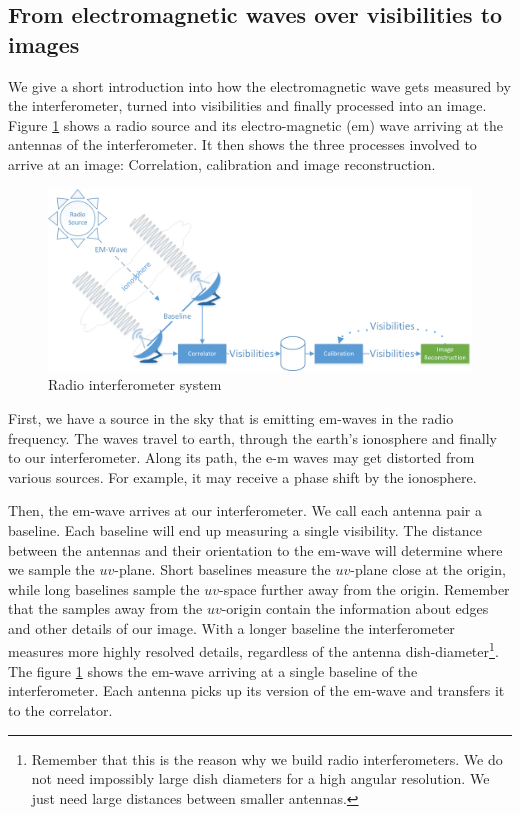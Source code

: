 \subsection{From electromagnetic waves over visibilities to images}
We give a short introduction into how the electromagnetic wave gets measured by the interferometer, turned into visibilities and finally processed into an image. Figure \ref{intro:system} shows a radio source and its electro-magnetic (em) wave arriving at the antennas of the interferometer. It then shows the three processes involved to arrive at an image: Correlation, calibration and image reconstruction.
	
\begin{figure}[h]
	\centering
	\includegraphics[width=0.80\linewidth]{./chapters/01.intro/system.png}
	\caption{Radio interferometer system}
	\label{intro:system}
\end{figure}

First, we have a source in the sky that is emitting em-waves in the radio frequency. The waves travel to earth, through the earth's ionosphere and finally to our interferometer. Along its path, the e-m waves may get distorted from various sources. For example, it may receive a phase shift by the ionosphere.

Then, the em-wave arrives at our interferometer. We call each antenna pair a baseline. Each baseline will end up measuring a single visibility. The distance between the antennas and their orientation to the em-wave will determine where we sample the $uv$-plane. Short baselines measure the $uv$-plane close at the origin, while long baselines sample the $uv$-space further away from the origin. Remember that the samples away from the $uv$-origin contain the information about edges and other details of our image. With a longer baseline the interferometer measures more highly resolved details, regardless of the antenna dish-diameter\footnote{Remember that this is the reason why we build radio interferometers. We do not need impossibly large dish diameters for a high angular resolution. We just need large distances between smaller antennas.}. The figure \ref{intro:system} shows the em-wave arriving at a single baseline of the interferometer. Each antenna picks up its version of the em-wave and transfers it to the correlator.

